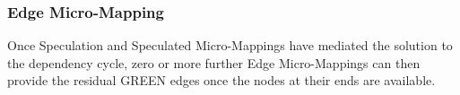 \documentclass[conference]{IEEEtran}
\begin{document}
\subsubsection{Edge Micro-Mapping}

Once Speculation and Speculated Micro-Mappings have mediated the solution to the dependency cycle, 
zero or more further Edge Micro-Mappings can then provide the residual GREEN edges once the nodes at their ends are available.






\end{document}
